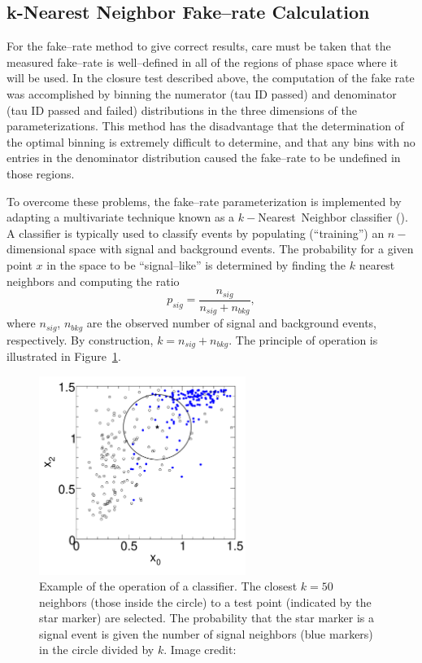 \subsection{k-Nearest Neighbor Fake--rate Calculation}
\label{sec:KNN}
For the fake--rate method to give correct results, care must be taken that the
measured fake--rate is well--defined in all of the regions of phase space where
it will be used.  In the closure test described above, the computation of the
fake rate was accomplished by binning the numerator (tau ID passed) and
denominator (tau ID passed and failed) distributions in the three dimensions of
the parameterizations. This method has the disadvantage that the determination
of the optimal binning is extremely difficult to determine, and that any
bins with no entries in the denominator distribution caused the fake--rate to be
undefined in those regions.

To overcome these problems, the fake--rate parameterization is implemented by
adapting a multivariate technique known as a $k-$Nearest~Neighbor classifier
(\kNN).  A \kNN classifier is typically used to classify events by
populating (``training'') an $n-$dimensional space with signal and background
events.  The probability for a given point $x$ in the space to be
``signal--like'' is determined by finding the $k$ nearest neighbors and
computing the ratio
\begin{equation}
  p_{sig} = \frac{n_{sig}}{n_{sig} + n_{bkg}},
  \label{eq:KNNEquation}
\end{equation}
where $n_{sig}$, $n_{bkg}$ are the observed number of signal and background
events, respectively. By construction, $k = n_{sig} + n_{bkg}$.  The principle
of operation is illustrated in Figure~\ref{fig:KNN}.
\begin{figure}
  \centering
  \includegraphics[width=0.6\textwidth]{backgrounds_chapter/figures/knn_3d_s13_b7_x02.pdf}
  \caption[$k-$Nearest Neighbor classifier example]{Example of the operation of
  a \kNN classifier.  The closest \mbox{$k=50$} neighbors (those inside the circle) to a
  test point (indicated by the star marker) are selected. The probability that
  the star marker is a signal event is given the number of signal neighbors (blue
  markers) in the circle divided by $k$. Image credit:~\cite{TMVA}}
  \label{fig:KNN}
\end{figure}

